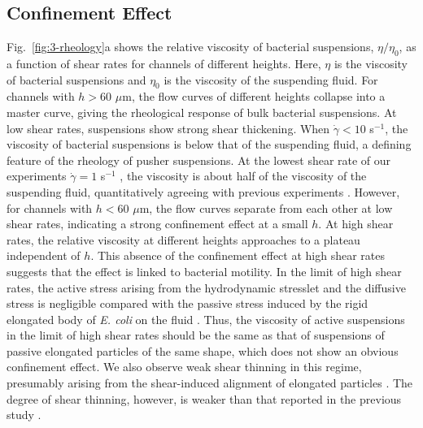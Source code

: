 \subsection{Confinement Effect}
Fig.~\ref{fig:3-rheology}a shows the relative viscosity of bacterial suspensions, $\eta/\eta_0$, as a function of shear rates for channels of different heights. Here, $\eta$ is the viscosity of bacterial suspensions and $\eta_0$ is the viscosity of the suspending fluid. For channels with $h > 60$ $\mu$m, the flow curves of different heights collapse into a master curve, giving the rheological response of bulk bacterial suspensions. At low shear rates, suspensions show strong shear thickening. When $\dot\gamma < 10$ s$^{-1}$, the viscosity of bacterial suspensions is below that of the suspending fluid, a defining feature of the rheology of pusher suspensions. At the lowest
shear rate of our experiments $\dot\gamma=1$ s$^{-1}$ , the viscosity is about half of the viscosity of the suspending fluid, quantitatively agreeing with previous experiments \cite{Gachelin2013}. However, for channels with $h < 60$ $\mu$m, the flow curves separate from each other at low shear rates, indicating a strong confinement effect at a small $h$. At high shear rates, the relative viscosity at different heights approaches to a plateau independent of $h$. This absence of the confinement effect at high shear rates suggests that the effect is linked to bacterial motility. In the limit of high shear rates, the active stress arising from the hydrodynamic stresslet and the diffusive stress is negligible compared with the passive stress induced by the rigid elongated body of \textit{E. coli} on the fluid \cite{Takatori2017, Saintillan2018}. Thus, the viscosity of active suspensions in
the limit of high shear rates should be the same as that of suspensions of passive elongated particles of the same shape, which does not show an obvious confinement effect. We also observe weak shear thinning in this regime, presumably arising from the shear-induced alignment of elongated particles \cite{Egres2006}. The degree of shear thinning, however, is weaker than that reported in the previous study \cite{Gachelin2013}.

